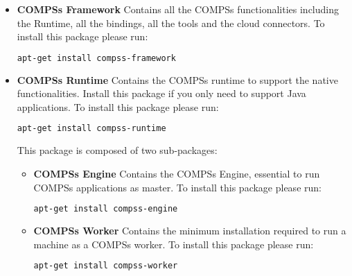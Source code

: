 \begin{itemize}
 \item \textbf{COMPSs Framework} \newline
       Contains all the COMPSs functionalities including the Runtime, all the bindings, all the tools and the cloud connectors.
       \newline
       To install this package please run:
       \begin{lstlisting}[language=bash]
	  apt-get install compss-framework
       \end{lstlisting}
 \item \textbf{COMPSs Runtime} \newline
       Contains the COMPSs runtime to support the native functionalities. Install this package if you only need to support Java
       applications.
       \newline
       To install this package please run:
       \begin{lstlisting}[language=bash]
	  apt-get install compss-runtime
       \end{lstlisting}
       This package is composed of two sub-packages:
       \begin{itemize}
        \item \textbf{COMPSs Engine} \newline
	      Contains the COMPSs Engine, essential to run COMPSs applications as master.
	      \newline
	      To install this package please run:
	      \begin{lstlisting}[language=bash]
		  apt-get install compss-engine
	      \end{lstlisting}
        \item \textbf{COMPSs Worker} \newline
              Contains the minimum installation required to run a machine as a COMPSs worker.
              \newline
              To install this package please run:
	      \begin{lstlisting}[language=bash]
		  apt-get install compss-worker
	      \end{lstlisting}
       \end{itemize}


\end{itemize}
